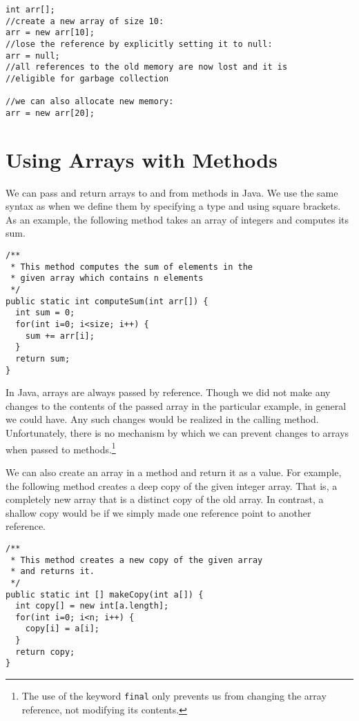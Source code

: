 \begin{verbatim}
int arr[];
//create a new array of size 10:
arr = new arr[10];
//lose the reference by explicitly setting it to null:
arr = null;
//all references to the old memory are now lost and it is 
//eligible for garbage collection

//we can also allocate new memory: 
arr = new arr[20];
\end{verbatim}

\section{Using Arrays with Methods}

We can pass and return arrays to and from methods in Java.
We use the same syntax as when we define them
by specifying a type and using square brackets.  As an example, 
the following method takes an array of integers and computes 
its sum.

\begin{verbatim}
/**
 * This method computes the sum of elements in the
 * given array which contains n elements
 */
public static int computeSum(int arr[]) {
  int sum = 0;
  for(int i=0; i<size; i++) {
    sum += arr[i];
  }
  return sum;
}
\end{verbatim}

In Java, arrays are always passed by reference.  Though we
did not make any changes to the contents of the passed array
in the particular example, in general we could have.  Any
such changes would be realized in the calling method.  Unfortunately, 
there is no mechanism by which we can prevent changes to
arrays when passed to methods.\footnote{The use of the keyword
\texttt{final} only prevents us from changing the
array reference, not modifying its contents.}

We can also create an array in a method and return it as a value.  
For example, the following method creates a \gls{deep copy} of
the given integer array.  That is, a completely new array that
is a distinct copy of the old array.  In contrast, a \gls{shallow copy}
would be if we simply made one reference point to another reference.

\begin{verbatim}
/**
 * This method creates a new copy of the given array
 * and returns it.
 */
public static int [] makeCopy(int a[]) {
  int copy[] = new int[a.length];
  for(int i=0; i<n; i++) {
    copy[i] = a[i];
  }
  return copy;
}
\end{verbatim}

